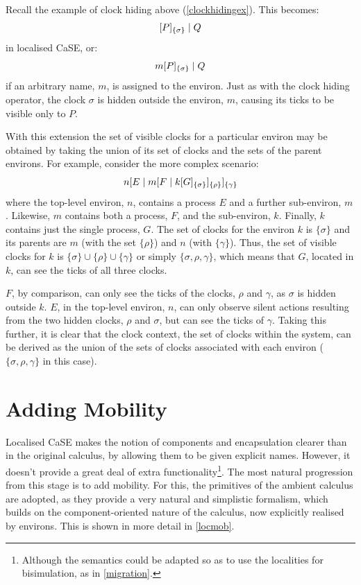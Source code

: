 Recall the example of clock hiding above (\ref{clockhidingex}).  This
becomes:
\begin{equation}
  {}[ P ]_{\{\sigma\}}\;|\;Q
\end{equation}
in localised CaSE, or:
\begin{equation}
  {m}[ P ]_{\{\sigma\}}\;|\;Q
\end{equation}
if an arbitrary name, $m$, is assigned to the environ.  Just
as with the clock hiding operator, the clock $\sigma$ is hidden outside
the environ, $m$, causing its ticks to be visible only to $P$.  

With this extension the set of visible clocks for a particular environ
may be obtained by taking the union of its set of clocks and the sets of
the parent environs.  For example, consider the more complex scenario:
\begin{equation}
{n}[ E\;|\;{m}[ F\;|\;{k}[ G ]_{\{\sigma\}} ]_{\{\rho\}} ]_{\{\gamma\}}
\end{equation}
where the top-level environ, $n$, contains a process $E$ and
a further sub-environ, $m$.  Likewise, $m$ contains both a process,
$F$, and the sub-environ, $k$.  Finally, $k$ contains just the single
process, $G$.  The set of clocks for the environ $k$ is $\{\sigma\}$
and its parents are $m$ (with the set $\{\rho\}$) and $n$ (with
$\{\gamma\}$).  Thus, the set of visible clocks for $k$ is $\{\sigma\}
\cup \{\rho\} \cup \{\gamma\}$ or simply $\{\sigma, \rho, \gamma\}$,
which means that $G$, located in $k$, can see the ticks of all three
clocks.

$F$, by comparison, can only see the ticks of the clocks, $\rho$ and
$\gamma$, as $\sigma$ is hidden outside $k$.  $E$, in the top-level
environ, $n$, can only observe silent actions resulting from the two
hidden clocks, $\rho$ and $\sigma$, but can see the ticks of $\gamma$.
Taking this further, it is clear that the clock context, the set of
clocks within the system, can be derived as the union of the sets of
clocks associated with each environ ($\{\sigma, \rho, \gamma\}$ in
this case).

\section{Adding Mobility}
\label{addingmob}

Localised CaSE makes the notion of components and encapsulation clearer
than in the original calculus, by allowing them to be given explicit
names.  However, it doesn't provide a great deal of extra
functionality\footnote{Although the semantics could be adapted so as to
use the localities for bisimulation, as in \ref{migration}.}.  The most
natural progression from this stage is to add mobility.  For this, the
primitives of the ambient calculus are adopted, as they provide a very
natural and simplistic formalism, which builds on the component-oriented
nature of the calculus, now explicitly realised by environs.  This is
shown in more detail in \ref{locmob}.

